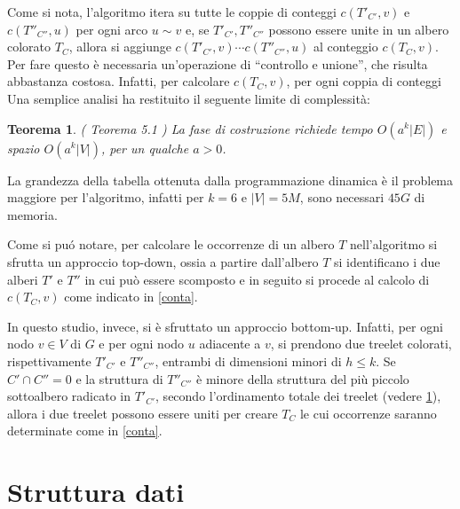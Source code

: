 Come si nota, l'algoritmo itera su tutte le coppie di conteggi $ c(T'_{C'},v) $ e $ c(T''_{C''},u) $ per ogni arco $ u\sim v $ e, se $ T'_{C'}, T''_{C''}  $  possono essere unite in un albero colorato $ T_C $, allora si aggiunge $ c(T'_{C'},v) \cdots c(T''_{C''},u)  $ al conteggio $ c(T_C,v) $.
Per fare questo \`e necessaria un'operazione di ``controllo e unione'', che risulta abbastanza costosa.
Infatti, per calcolare $ c(T_C,v) $, per ogni coppia di conteggi 
Una semplice analisi ha restituito il seguente limite di complessit\`a:

\newtheorem{teorema}{Teorema}[section]
\begin{teorema}
	(\cite{bressan2018motif} \textit{Teorema 5.1} ) La fase di costruzione richiede tempo $ O(a^{k}|E|) $ e spazio $ O(a^{k}|V|) $, per un qualche $ a > 0 $.
	
\end{teorema}

La grandezza della tabella ottenuta dalla programmazione dinamica \`e il problema maggiore per l'algoritmo, infatti per $ k=6 $ e $ |V| = 5M $, sono necessari $ 45G $ di memoria.

Come si pu\'o notare, per calcolare le occorrenze di un albero $ T $ nell'algoritmo si sfrutta un approccio top-down, ossia a partire dall'albero $ T $ si identificano i due alberi $ T' $ e $ T'' $ in cui pu\`o essere scomposto e in seguito si procede al calcolo di $ c(T_C,v) $ come indicato in \ref{conta}.

In questo studio, invece, si \`e sfruttato un approccio bottom-up. Infatti, per ogni nodo $ v \in V $ di $ G $ e per ogni nodo $ u $  adiacente a $v$, si prendono due treelet colorati, rispettivamente $ T'_{C'} $ e $ T''_{C''} $, entrambi di dimensioni minori di $ h \le k $.
Se $ C' \cap C'' = 0 $ e la struttura di $ T''_{C''} $ \`e minore della struttura del pi\`u piccolo sottoalbero radicato in $ T'_{C'} $, secondo l'ordinamento totale dei treelet (vedere \ref{section 2}), allora i due treelet possono essere uniti per creare $ T_C $ le cui occorrenze saranno determinate come in \ref{conta}.

\section{Struttura dati}
\label{section 2}

	
